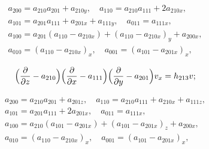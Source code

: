 \begin{equation}\label{mironov42}


\begin{array}{c}


a_{200}=a_{210}a_{201}+a_{210y},\quad


a_{110}=a_{210}a_{111}+2a_{210x},\\


a_{101}=a_{201}a_{111}+a_{201x}+a_{111y},\quad


a_{011}=a_{111x},\\


a_{100}=a_{201}(a_{110}-a_{210x})+(a_{110}-a_{210x})_{y}+a_{200x},\\


a_{010}=(a_{110}-a_{210x})_{x},\quad


a_{001}=(a_{101}-a_{201x})_{x},


\end{array}


\end{equation}


$$


\Bigl ( \frac{\partial}{\partial z}-a_{210} \Bigr )


\Bigl ( \frac{\partial}{\partial x}-a_{111} \Bigr )


\Bigl ( \frac{\partial}{\partial y}-a_{201} \Bigr )


v_{x} = h_{213}v;


$$





\begin{equation}\label{mironov43}


\begin{array}{c}


a_{200}=a_{210}a_{201}+a_{201z},\quad


a_{110}=a_{210}a_{111}+a_{210x}+a_{111z},\\


a_{101}=a_{201}a_{111}+2a_{201x},\quad


a_{011}=a_{111x},\\


a_{100}=a_{210}(a_{101}-a_{201x})+(a_{101}-a_{201x})_{z}+a_{200x},\\


a_{010}=(a_{110}-a_{210x})_{x},\quad a_{001}=(a_{101}-a_{201x})_{x},


\end{array}


\end{equation}


